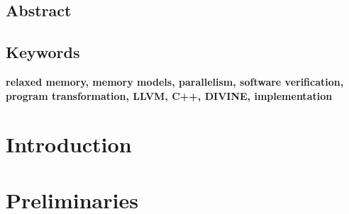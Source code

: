 \documentclass[11pt,twoside,a4paper]{book}
\newcommand{\FI}{Faculty of Informatics}
\newcommand{\MU}{Masaryk University}
\newcommand{\Jirik}{prof. RNDr. Jiří Barnat, Ph.D.}
\newcommand{\thesistitle}{Analysis of Parallel C++ Programs} %
\newcommand{\thesissubtitle}{PHD Thesis}
\newcommand{\thesisauthor}{Vladimír Štill}
\newcommand{\thesisYearCity}{Brno, 2020}
\newcommand{\thesisadvisor}{\Jirik}
\theoremstyle{mydefstyle}
\newcommand{\TODO}[1]{{\bf\color{red}#1}}
\begin{document}

\frontmatter
 
 
\cleardoublepage

\section*{Abstract}
% 

\section*{Keywords}
\TODO{relaxed memory, memory models, parallelism, software verification, program transformation,
LLVM, C++, DIVINE, implementation}

\cleardoublepage
\thispagestyle{empty}

\pagestyle{fancy}
\tableofcontents %
\mainmatter

\chapter{Introduction}\label{chap:introduction}


\chapter{Preliminaries}\label{chap:preliminaries}

\end{document}
